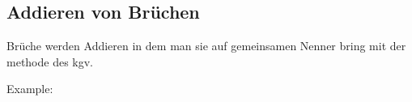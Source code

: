 \subsection{Addieren von Brüchen}

Brüche werden Addieren in dem man sie auf gemeinsamen Nenner bring mit der methode des kgv.

\hfill \break
Example:
\fboxrule=0.8pt 